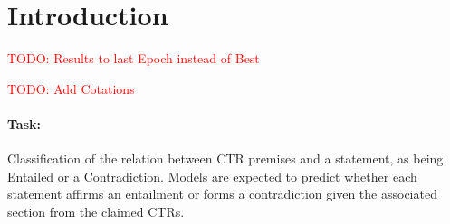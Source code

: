 \section{Introduction}\label{sec:introduction}

\textcolor{red}{TODO: Results to last Epoch instead of Best}

\textcolor{red}{TODO: Add Cotations}


\paragraph{\textbf{Task:}} Classification of the relation between CTR premises and a 
statement, as being Entailed or a Contradiction. Models are expected to predict whether 
each statement affirms an entailment or forms a contradiction given the associated 
section from the claimed CTRs.







